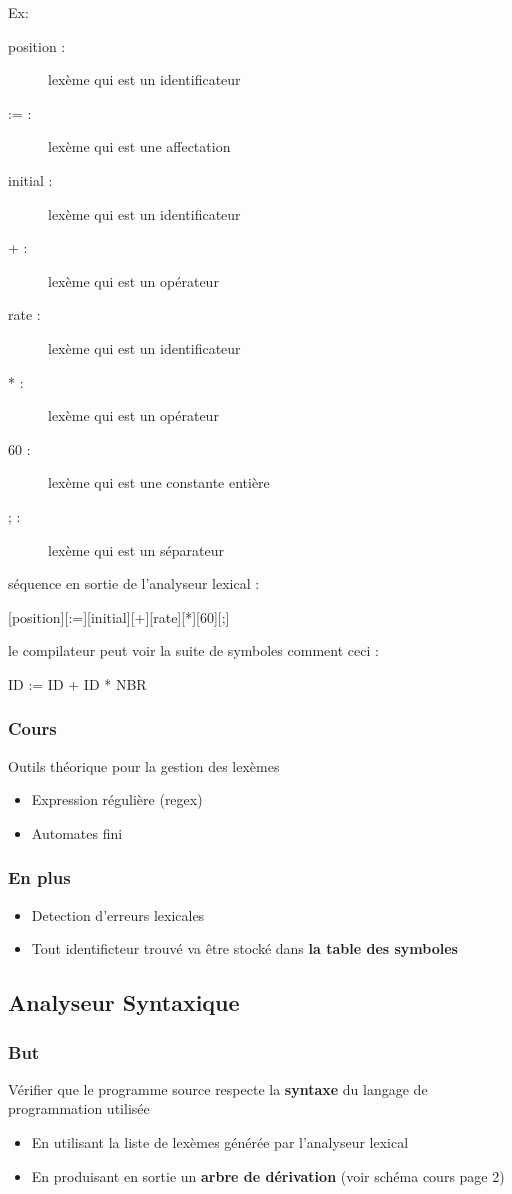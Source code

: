 \documentclass[a4paper,10pt]{report}
\begin{document}
Ex:


\begin{description}
 \item[position :] lexème qui est un identificateur
 \item[:= :] lexème qui est une affectation
 \item[initial :] lexème qui est un identificateur
 \item[+ :] lexème qui est un opérateur
 \item[rate :] lexème qui est un identificateur
 \item[* :] lexème qui est un opérateur
 \item[60 :] lexème qui est une constante entière
 \item[; :] lexème qui est un séparateur
\end{description}                

séquence en sortie de l'analyseur lexical :

[position][:=][initial][+][rate][*][60][;]

le compilateur peut voir la suite de symboles comment ceci : 

ID := ID + ID * NBR
\subsubsection{Cours}
Outils théorique pour la gestion des lexèmes
\begin{itemize}
 \item Expression régulière (regex)
 \item Automates fini
\end{itemize}

\subsubsection{En plus}
  \begin{itemize}
   \item Detection d'erreurs lexicales
   \item Tout identificteur trouvé va être stocké dans \textbf{la table des symboles}
  \end{itemize}
  
 \subsection{Analyseur Syntaxique}
  \subsubsection{But}
  Vérifier que le programme source respecte la \textbf{syntaxe} du langage de programmation utilisée
  \begin{itemize}
   \item En utilisant la liste de lexèmes générée par l'analyseur lexical
   \item En produisant en sortie un \textbf{arbre de dérivation} (voir schéma cours page 2)
  \end{itemize}
\end{document}
